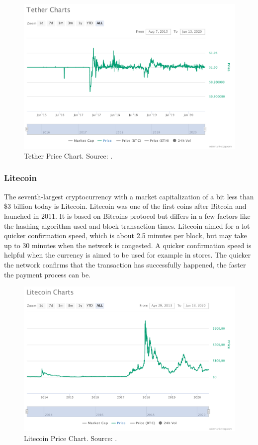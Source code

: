 \documentclass[11pt,a4paper,compsoc,conference]{IEEEtran}
\begin{document}
\begin{figure}[H]
    \centering
    \includegraphics[width=\linewidth]{figures/tether-charts (1).pdf}
    \caption[Tether Price Chart]{Tether Price Chart. Source: \citep{coinmarketcap}. }
    \label{fig:Tether}
\end{figure}

\subsubsection{Litecoin}
The seventh-largest cryptocurrency with a market capitalization of a bit less than \$3 billion  today is Litecoin. Litecoin was one of the first coins after Bitcoin and launched in 2011. It is based on Bitcoins protocol but differs in a few factors like the hashing algorithm used and block transaction times. Litecoin aimed for a lot quicker confirmation speed, which is about 2.5 minutes per block, but may take up to 30 minutes when the network is congested. A quicker confirmation speed is helpful when the currency is aimed to be used for example in stores. The quicker the network confirms that the transaction has successfully happened, the faster the payment process can be. 

\begin{figure}[H]
    \centering
    \includegraphics[width=\linewidth]{figures/litecoin-charts.pdf}
    \caption[Litecoin Price Chart]{Litecoin Price Chart. Source: \citep{coinmarketcap}. }
    \label{fig:Litecoin}
\end{figure}
\end{document}
